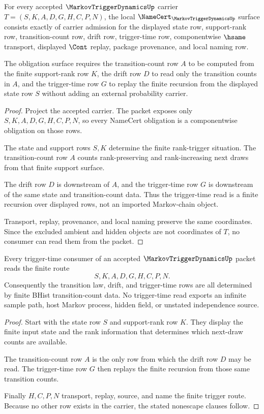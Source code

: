 \begin{theorem}
\label{thm:markov-trigger-dynamics-namecert-obligations}
For every accepted $\MarkovTriggerDynamicsUp$ carrier $T=(S,K,A,D,G,H,C,P,N)$, the local $\NameCert_{\MarkovTriggerDynamicsUp}$ surface consists exactly of carrier admission for the displayed state row, support-rank row, transition-count row, drift row, trigger-time row, componentwise $\hsame$ transport, displayed $\Cont$ replay, package provenance, and local naming row.

The obligation surface requires the transition-count row $A$ to be computed from the finite support-rank row $K$, the drift row $D$ to read only the transition counts in $A$, and the trigger-time row $G$ to replay the finite recursion from the displayed state row $S$ without adding an external probability carrier.
\end{theorem}
\begin{proof}
Project the accepted carrier. The packet exposes only $S,K,A,D,G,H,C,P,N$, so every NameCert obligation is a componentwise obligation on those rows.

The state and support rows $S,K$ determine the finite rank-trigger situation. The transition-count row $A$ counts rank-preserving and rank-increasing next draws from that finite support surface.

The drift row $D$ is downstream of $A$, and the trigger-time row $G$ is downstream of the same state and transition-count data. Thus the trigger-time read is a finite recursion over displayed rows, not an imported Markov-chain object.

Transport, replay, provenance, and local naming preserve the same coordinates. Since the excluded ambient and hidden objects are not coordinates of $T$, no consumer can read them from the packet.
\end{proof}

\begin{theorem}
\label{thm:markov-trigger-dynamics-finite-trigger-readback}
Every trigger-time consumer of an accepted $\MarkovTriggerDynamicsUp$ packet reads the finite route
$$
S,K,A,D,G,H,C,P,N .
$$
Consequently the transition law, drift, and trigger-time rows are all determined by finite BHist transition-count data. No trigger-time read exports an infinite sample path, host Markov process, hidden field, or unstated independence source.
\end{theorem}
\begin{proof}
Start with the state row $S$ and support-rank row $K$. They display the finite input state and the rank information that determines which next-draw counts are available.

The transition-count row $A$ is the only row from which the drift row $D$ may be read. The trigger-time row $G$ then replays the finite recursion from those same transition counts.

Finally $H,C,P,N$ transport, replay, source, and name the finite trigger route. Because no other row exists in the carrier, the stated nonescape clauses follow.
\end{proof}

